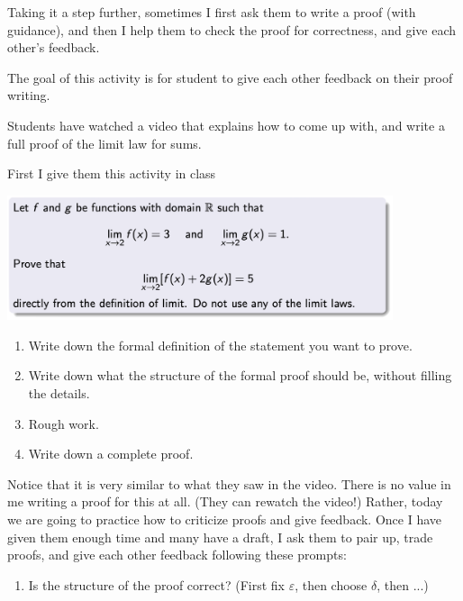 \documentclass[11pt]{article}
\begin{document}

	\newpage

	{Taking it a step further, sometimes I first ask them to write a proof (with guidance), and then I help them to check the proof for correctness, and give each other's feedback. }

	\begin{example}
		The goal of this activity is for student to give each other feedback on their
		proof writing.
		\begin{background}
			Students have watched a video that explains how to come up with, and write
			a full proof of the limit law for sums.
		\end{background}
		\begin{question}
			First I give them this activity in class
			\begin{center}
				\begin{minipage}{0.8\textwidth}
					\includegraphics[width=0.85\textwidth]{EX9}
					\begin{enumerate}
						\item Write down the formal definition of the statement you want to prove.

						\item Write down what the structure of the formal proof should be,
							without filling the details.

						\item Rough work.

						\item Write down a complete proof.
					\end{enumerate}
				\end{minipage}
			\end{center}
		\end{question}
		\begin{comments}
			Notice that it is very similar to what they saw in the video. There is no
			value in me writing a proof for this at all. (They can rewatch the video!)
			Rather, today we are going to practice how to criticize proofs and give feedback.
			Once I have given them enough time and many have a draft, I ask them to pair
			up, trade proofs, and give each other feedback following these prompts:
			\begin{center}
				\begin{minipage}{0.8\textwidth}
					\begin{enumerate}
						\item Is the structure of the proof correct? (First fix $\varepsilon$,
							then choose $\delta$, then ...)


\end{enumerate}
\end{minipage}
\end{center}
\end{comments}
\end{example}
\end{document}
